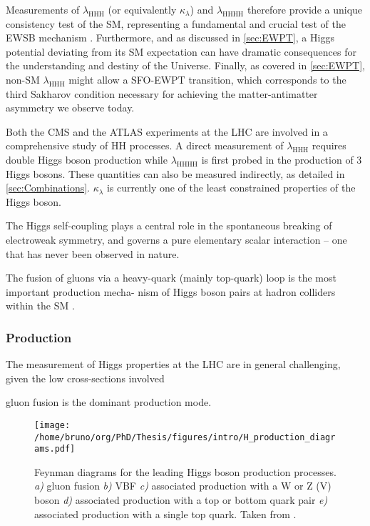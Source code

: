 \documentclass[11pt]{article}
\newcommand{\klfour}{\lambda_{\text{HHHH}}}
\newcommand{\klthree}{\lambda_{\text{HHH}}}
\newcommand{\kl}{\kappa_{\lambda}}
\begin{document}
Measurements of \(\klthree\) (or equivalently \(\kl\)) and \(\klfour\) therefore provide a unique consistency test of the \ac{SM}, representing a fundamental and crucial test of the \ac{EWSB} mechanism \cite{deFlorian:2227475}.
Furthermore, and as discussed in \cref{sec:EWPT}, a Higgs potential deviating from its SM expectation can have dramatic consequences for the understanding and destiny of the Universe.
Finally, as covered in \cref{sec:EWPT}, non-SM \(\klthree\) might allow a \ac{SFO-EWPT} transition, which corresponds to the third Sakharov condition necessary for achieving the matter-antimatter asymmetry we observe today.

Both the \ac{CMS} and the \ac{ATLAS} experiments at the \ac{LHC} are involved in a comprehensive study of HH processes.
A direct measurement of \(\klthree\) requires double Higgs boson production while \(\klfour\) is first probed in the production of 3 Higgs bosons.
These quantities can also be measured indirectly, as detailed in \cref{sec:Combinations}.
\(\kl\) is currently one of the least constrained properties of the Higgs boson.


The Higgs self-coupling plays a central role in the spontaneous breaking of electroweak symmetry, and governs a pure elementary scalar interaction – one that has never been observed in nature.

The fusion of gluons via a heavy-quark (mainly top-quark) loop is the most important production mecha-
nism of Higgs boson pairs at hadron colliders within the SM \cite{hllhc_physics}.

\subsubsection{Production}
\label{sec:org6e12979}
\label{sec:production}

The measurement of Higgs properties at the LHC are in general challenging, given the low cross-sections involved

gluon fusion is the dominant production mode.

\begin{figure}[htbp]
\centering
\texttt{[image: /home/bruno/org/PhD/Thesis/figures/intro/H\_production\_diagrams.pdf]}
\caption{\label{fig:H_production_diagrams}Feynman diagrams for the leading Higgs boson production processes. \emph{a)} gluon fusion \emph{b)} \ac{VBF} \emph{c)} associated production with a W or Z (V) boson \emph{d)} associated production with a top or bottom quark pair \emph{e)} associated production with a single top quark. Taken from \cite{higgs_10_years}.}
\end{figure}
\end{document}
